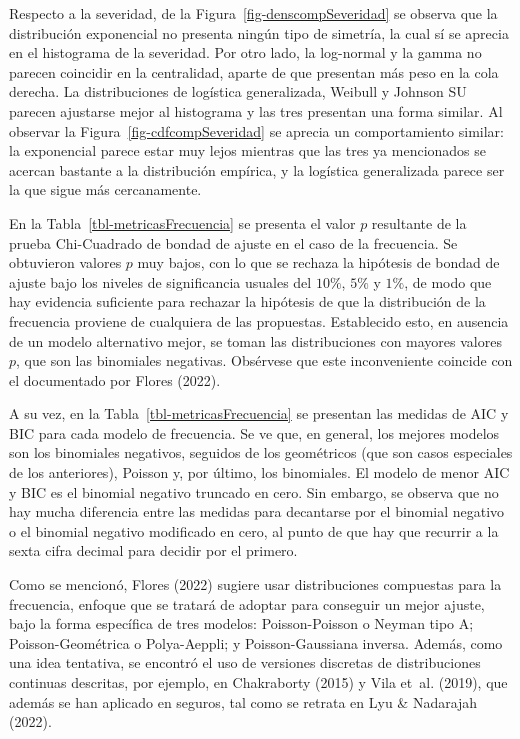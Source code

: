 \documentclass[
  letterpaper,
  onepage,
  openany]{scrreprt}
\begin{document}
Respecto a la severidad, de la Figura~\ref{fig-denscompSeveridad} se
observa que la distribución exponencial no presenta ningún tipo de
simetría, la cual sí se aprecia en el histograma de la severidad. Por
otro lado, la log-normal y la gamma no parecen coincidir en la
centralidad, aparte de que presentan más peso en la cola derecha. La
distribuciones de logística generalizada, Weibull y Johnson SU parecen
ajustarse mejor al histograma y las tres presentan una forma similar. Al
observar la Figura~\ref{fig-cdfcompSeveridad} se aprecia un
comportamiento similar: la exponencial parece estar muy lejos mientras
que las tres ya mencionados se acercan bastante a la distribución
empírica, y la logística generalizada parece ser la que sigue más
cercanamente.

En la Tabla~\ref{tbl-metricasFrecuencia} se presenta el valor \(p\)
resultante de la prueba Chi-Cuadrado de bondad de ajuste en el caso de
la frecuencia. Se obtuvieron valores \(p\) muy bajos, con lo que se
rechaza la hipótesis de bondad de ajuste bajo los niveles de
significancia usuales del \(10\%\), \(5\%\) y \(1\%\), de modo que hay
evidencia suficiente para rechazar la hipótesis de que la distribución
de la frecuencia proviene de cualquiera de las propuestas. Establecido
esto, en ausencia de un modelo alternativo mejor, se toman las
distribuciones con mayores valores \(p\), que son las binomiales
negativas. Obsérvese que este inconveniente coincide con el documentado
por Flores (2022).

A su vez, en la Tabla~\ref{tbl-metricasFrecuencia} se presentan las
medidas de AIC y BIC para cada modelo de frecuencia. Se ve que, en
general, los mejores modelos son los binomiales negativos, seguidos de
los geométricos (que son casos especiales de los anteriores), Poisson y,
por último, los binomiales. El modelo de menor AIC y BIC es el binomial
negativo truncado en cero. Sin embargo, se observa que no hay mucha
diferencia entre las medidas para decantarse por el binomial negativo o
el binomial negativo modificado en cero, al punto de que hay que
recurrir a la sexta cifra decimal para decidir por el primero.

Como se mencionó, Flores (2022) sugiere usar distribuciones compuestas
para la frecuencia, enfoque que se tratará de adoptar para conseguir un
mejor ajuste, bajo la forma específica de tres modelos: Poisson-Poisson
o Neyman tipo A; Poisson-Geométrica o Polya-Aeppli; y Poisson-Gaussiana
inversa. Además, como una idea tentativa, se encontró el uso de
versiones discretas de distribuciones continuas descritas, por ejemplo,
en Chakraborty (2015) y Vila et~al. (2019), que además se han aplicado
en seguros, tal como se retrata en Lyu \& Nadarajah (2022).
\end{document}
